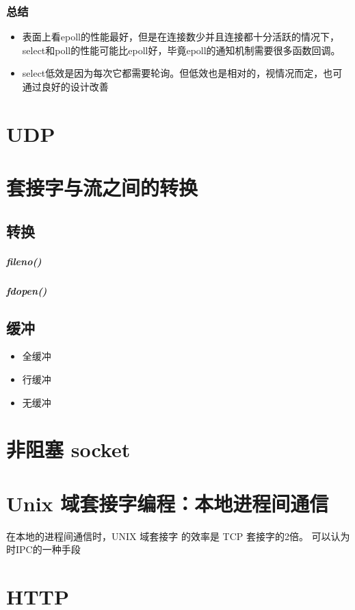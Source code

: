 \documentclass[UTF8,a4paper,12pt]{ctexbook}
\begin{document}
				
			\subsubsection{总结}
				\begin{itemize}
					\item   表面上看epoll的性能最好，但是在连接数少并且连接都十分活跃的情况下，select和poll的性能可能比epoll好，毕竟epoll的通知机制需要很多函数回调。
					\item select低效是因为每次它都需要轮询。但低效也是相对的，视情况而定，也可通过良好的设计改善
				\end{itemize}
	\section{UDP}
		
	\section{套接字与流之间的转换}
		\subsection{转换}
			\subparagraph{fileno()}
			
			\subparagraph{fdopen()}
			
		\subsection{缓冲}
			\begin{itemize}
				\item 全缓冲
				\item 行缓冲
				\item 无缓冲
			\end{itemize}
			
	\section{非阻塞 socket}
		
	
	\section{Unix 域套接字编程：本地进程间通信}
		在本地的进程间通信时，UNIX 域套接字 的效率是 TCP 套接字的2倍。 可以认为时IPC的一种手段

	\section{HTTP}
\end{document}
